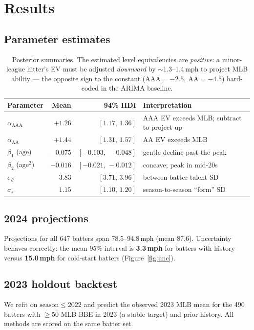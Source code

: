 \documentclass[11pt]{article}
\newcommand{\mph}{\,mph}
\begin{document}
\section{Results}
\subsection{Parameter estimates}
\begin{table}[h]
\centering
\small
\begin{tabular}{lrrl}
\toprule
Parameter & Mean & 94\% HDI & Interpretation \\
\midrule
$\alpha_{\text{AAA}}$ & $+1.26$ & $[1.17,\,1.36]$ & AAA EV exceeds MLB; subtract to project up \\
$\alpha_{\text{AA}}$  & $+1.44$ & $[1.31,\,1.57]$ & AA EV exceeds MLB \\
$\beta_1$ (age)       & $-0.075$ & $[-0.103,\,-0.048]$ & gentle decline past the peak \\
$\beta_2$ (age$^2$)   & $-0.016$ & $[-0.021,\,-0.012]$ & concave; peak in mid-20s \\
$\sigma_\theta$       & $3.83$  & $[3.71,\,3.96]$ & between-batter talent SD \\
$\sigma_s$            & $1.15$  & $[1.10,\,1.20]$ & season-to-season ``form'' SD \\
\bottomrule
\end{tabular}
\caption{Posterior summaries. The estimated level equivalencies are \emph{positive}:
a minor-league hitter's EV must be adjusted \emph{downward} by $\sim$1.3--1.4\mph{}
to project MLB ability --- the opposite sign to the constant
($\text{AAA}=-2.5,\ \text{AA}=-4.5$) hard-coded in the ARIMA baseline.}
\end{table}

\subsection{2024 projections}
Projections for all 647 batters span 78.5--94.8\mph{} (mean 87.6). Uncertainty
behaves correctly: the mean 95\% interval is \textbf{3.3\mph{}} for batters with
history versus \textbf{15.0\mph{}} for cold-start batters (Figure~\ref{fig:unc}).

\subsection{2023 holdout backtest}
We refit on $\text{season}\le 2022$ and predict the observed 2023 MLB mean for the
490 batters with $\ge 50$ MLB BBE in 2023 (a stable target) and prior history. All
methods are scored on the same batter set.
\end{document}
